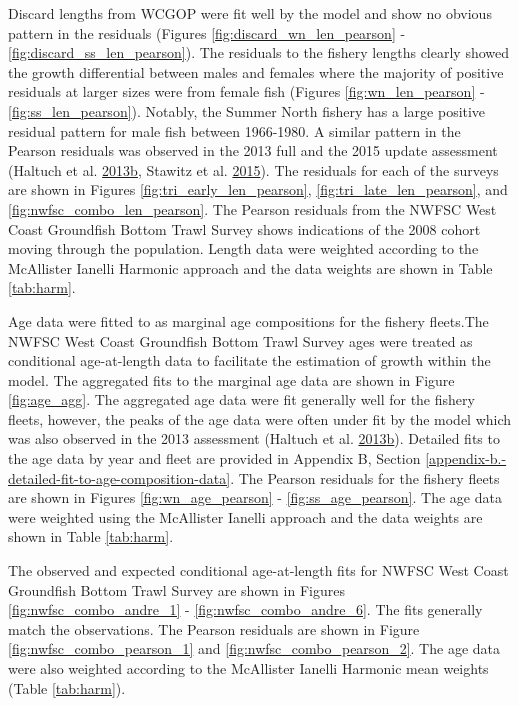 \documentclass[12pt,]{article}
\begin{document}
Discard lengths from WCGOP were fit well by the model and show no
obvious pattern in the residuals (Figures
\ref{fig:discard_wn_len_pearson} - \ref{fig:discard_ss_len_pearson}).
The residuals to the fishery lengths clearly showed the growth
differential between males and females where the majority of positive
residuals at larger sizes were from female fish (Figures
\ref{fig:wn_len_pearson} - \ref{fig:ss_len_pearson}). Notably, the
Summer North fishery has a large positive residual pattern for male fish
between 1966-1980. A similar pattern in the Pearson residuals was
observed in the 2013 full and the 2015 update assessment (Haltuch et al.
\protect\hyperlink{ref-haltuch_status_2013}{2013}\protect\hyperlink{ref-haltuch_status_2013}{b},
Stawitz et al. \protect\hyperlink{ref-stawitz_stock_2015}{2015}). The
residuals for each of the surveys are shown in Figures
\ref{fig:tri_early_len_pearson}, \ref{fig:tri_late_len_pearson}, and
\ref{fig:nwfsc_combo_len_pearson}. The Pearson residuals from the NWFSC
West Coast Groundfish Bottom Trawl Survey shows indications of the 2008
cohort moving through the population. Length data were weighted
according to the McAllister Ianelli Harmonic approach and the data
weights are shown in Table \ref{tab:harm}.

Age data were fitted to as marginal age compositions for the fishery
fleets.The NWFSC West Coast Groundfish Bottom Trawl Survey ages were
treated as conditional age-at-length data to facilitate the estimation
of growth within the model. The aggregated fits to the marginal age data
are shown in Figure \ref{fig:age_agg}. The aggregated age data were fit
generally well for the fishery fleets, however, the peaks of the age
data were often under fit by the model which was also observed in the
2013 assessment (Haltuch et al.
\protect\hyperlink{ref-haltuch_status_2013}{2013}\protect\hyperlink{ref-haltuch_status_2013}{b}).
Detailed fits to the age data by year and fleet are provided in Appendix
B, Section \ref{appendix-b.-detailed-fit-to-age-composition-data}. The
Pearson residuals for the fishery fleets are shown in Figures
\ref{fig:wn_age_pearson} - \ref{fig:ss_age_pearson}. The age data were
weighted using the McAllister Ianelli approach and the data weights are
shown in Table \ref{tab:harm}.

The observed and expected conditional age-at-length fits for NWFSC West
Coast Groundfish Bottom Trawl Survey are shown in Figures
\ref{fig:nwfsc_combo_andre_1} - \ref{fig:nwfsc_combo_andre_6}. The fits
generally match the observations. The Pearson residuals are shown in
Figure \ref{fig:nwfsc_combo_pearson_1} and
\ref{fig:nwfsc_combo_pearson_2}. The age data were also weighted
according to the McAllister Ianelli Harmonic mean weights (Table
\ref{tab:harm}).
\end{document}
